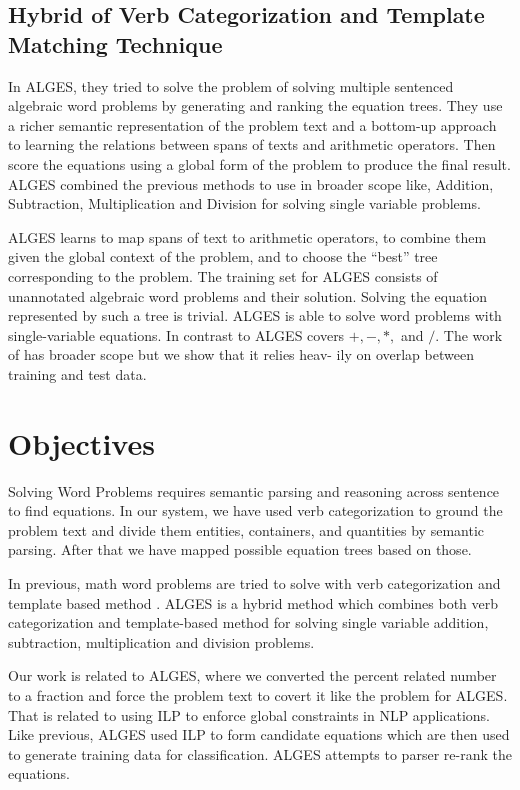 \documentclass[document.tex]{subfiles}
\begin{document}
\subsection{Hybrid of Verb Categorization and Template Matching Technique}
\noindent In ALGES\cite{3}, they tried to solve the problem of solving multiple sentenced algebraic word problems by generating and ranking the equation trees. They use a richer semantic representation of the problem text and a bottom-up approach to learning the relations between spans of texts and arithmetic operators. Then score the equations using a global form of the problem to produce the final result. ALGES combined the previous methods to use in broader scope like, Addition, Subtraction, Multiplication and Division for solving single variable problems.

ALGES learns to map spans of text to arithmetic operators, to combine them given the global context of the problem, and to
choose the “best” tree corresponding to the problem.
The training set for ALGES consists of unannotated
algebraic word problems and their solution. Solving the equation represented by such a tree is trivial.
ALGES is able to solve word problems with single-variable equations.
In contrast to \cite{1} ALGES covers $ +, -, *, $ and $/$. The work of \cite{2} has broader scope but we show that it relies heav-
ily on overlap between training and test data.
\section{Objectives}

Solving Word Problems requires semantic parsing and
reasoning across sentence to find equations. In our system, we
have used verb categorization to ground the problem text and
divide them entities, containers, and quantities by semantic
parsing. After that we have mapped possible equation trees
based on those.

In previous, math word problems are tried to
solve with verb categorization \cite{1} and template based method \cite{2}. ALGES \cite{3} is a hybrid method which combines both verb categorization and template-based method for solving single variable addition, subtraction, multiplication and division
problems.

Our work is related to ALGES, where we converted the percent related number to a fraction and force the problem text to covert it like the problem for ALGES. That is related to using ILP to enforce global constraints in NLP applications\cite{24}. Like previous\cite{25, 26, 27, 28}, ALGES used ILP to form candidate equations which are then used to generate training data for classification. ALGES attempts to parser re-rank the equations\cite{29, 30}.
\end{document}
